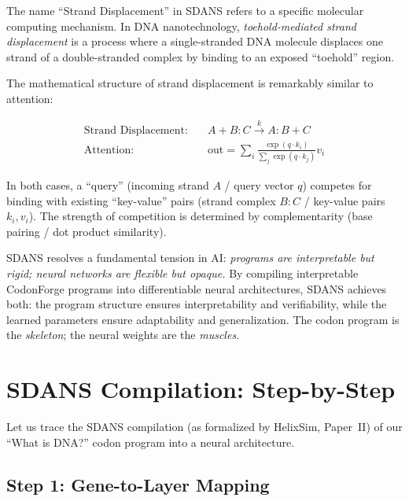 The name ``Strand Displacement'' in SDANS refers to a specific molecular computing mechanism. In DNA nanotechnology, \emph{toehold-mediated strand displacement} is a process where a single-stranded DNA molecule displaces one strand of a double-stranded complex by binding to an exposed ``toehold'' region.

The mathematical structure of strand displacement is remarkably similar to attention:

\begin{align}
\text{Strand Displacement:} &\quad A + B{:}C \xrightarrow{k} A{:}B + C \label{eq:strand-displace} \\
\text{Attention:} &\quad \text{out} = \sum_i \frac{\exp(q \cdot k_i)}{\sum_j \exp(q \cdot k_j)} v_i \label{eq:attention-analogy}
\end{align}

In both cases, a ``query'' (incoming strand $A$ / query vector $q$) competes for binding with existing ``key-value'' pairs (strand complex $B{:}C$ / key-value pairs $k_i, v_i$). The strength of competition is determined by complementarity (base pairing / dot product similarity).

\begin{keyinsight}
SDANS resolves a fundamental tension in AI: \emph{programs are interpretable but rigid; neural networks are flexible but opaque.} By compiling interpretable CodonForge programs into differentiable neural architectures, SDANS achieves both: the program structure ensures interpretability and verifiability, while the learned parameters ensure adaptability and generalization. The codon program is the \emph{skeleton}; the neural weights are the \emph{muscles}.
\end{keyinsight}


\section{SDANS Compilation: Step-by-Step}
\label{sec:sdans-step-by-step}

Let us trace the SDANS compilation (as formalized by HelixSim, Paper~II) of our ``What is DNA?'' codon program into a neural architecture.

\subsection{Step 1: Gene-to-Layer Mapping}

